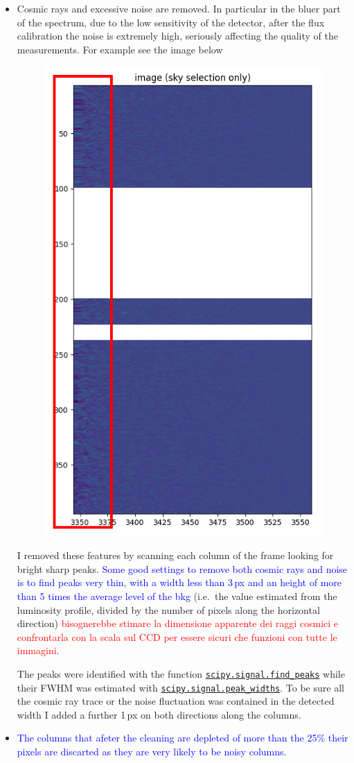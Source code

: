 \documentclass{article}
\newcommand{\arbitrario}[1]{\textcolor{blue}{#1}}
\begin{document}
\begin{itemize}
	\item Cosmic rays and excessive noise are removed. In particular in the bluer part of the spectrum, due to the low sensitivity of the detector, after the flux calibration the noise is extremely high, seriously affecting the quality of the measurements. For example see the image below
	\begin{figure}[h!]
		\centering
		\includegraphics[width=.35\textwidth, angle=90]{10_det}
	\end{figure}
	I removed these features by scanning each column of the frame looking for bright sharp peaks. \arbitrario{Some good settings to remove both cosmic rays and noise is to find peaks very thin, with a width less than 3\,px and an height of more than 5 times the average level of the bkg} (i.e.\ the value estimated from the luminosity profile, divided by the number of pixels along the horizontal direction) \textcolor{red}{bisognerebbe stimare la dimensione apparente dei raggi cosmici e confrontarla con la scala sul CCD per essere sicuri che funzioni con tutte le immagini}.
	
	The peaks were identified with the function \href{https://docs.scipy.org/doc/scipy/reference/generated/scipy.signal.find_peaks.html}{\texttt{scipy.signal.find\_peaks}} while their FWHM was estimated with \href{https://docs.scipy.org/doc/scipy/reference/generated/scipy.signal.peak_widths.html#scipy.signal.peak_widths}{\texttt{scipy.signal.peak\_widths}}. To be sure all the cosmic ray trace or the noise fluctuation was contained in the detected width I added a further 1\,px on both directions along the columns.
	
	\item \arbitrario{The columns that afeter the cleaning are depleted of more than the 25\% their pixels are discarted as they are very likely to be noisy columns.}
	

\end{itemize}
\end{document}
